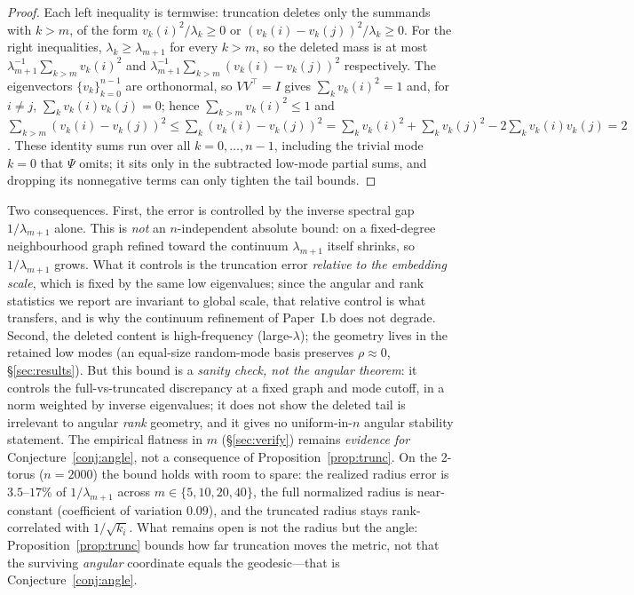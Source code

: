 \documentclass[review]{siamart220329}
\begin{document}
\begin{proof}
Each left inequality is termwise: truncation deletes only the summands with
$k>m$, of the form $v_k(i)^2/\lambda_k\ge0$ or
$(v_k(i)-v_k(j))^2/\lambda_k\ge0$. For the right inequalities,
$\lambda_k\ge\lambda_{m+1}$ for every $k>m$, so the deleted mass is at most
$\lambda_{m+1}^{-1}\sum_{k>m}v_k(i)^2$ and
$\lambda_{m+1}^{-1}\sum_{k>m}(v_k(i)-v_k(j))^2$ respectively. The eigenvectors
$\{v_k\}_{k=0}^{n-1}$ are orthonormal, so $VV^{\top}=I$ gives $\sum_k v_k(i)^2=1$
and, for $i\neq j$, $\sum_k v_k(i)v_k(j)=0$; hence $\sum_{k>m}v_k(i)^2\le1$ and
$\sum_{k>m}(v_k(i)-v_k(j))^2\le\sum_k(v_k(i)-v_k(j))^2
=\sum_k v_k(i)^2+\sum_k v_k(j)^2-2\sum_k v_k(i)v_k(j)=2$. These identity sums run
over all $k=0,\dots,n-1$, including the trivial mode $k=0$ that $\Psi$ omits; it
sits only in the subtracted low-mode partial sums, and dropping its nonnegative
terms can only tighten the tail bounds.
\end{proof}

Two consequences. First, the error is controlled by the inverse spectral gap
$1/\lambda_{m+1}$ alone. This is \emph{not} an $n$-independent absolute bound: on a
fixed-degree neighbourhood graph refined toward the continuum $\lambda_{m+1}$
itself shrinks, so $1/\lambda_{m+1}$ grows. What it controls is the truncation
error \emph{relative to the embedding scale}, which is fixed by the same low
eigenvalues; since the angular and rank statistics we report are invariant to
global scale, that relative control is what transfers, and is why the continuum
refinement of Paper~I.b does not degrade. Second, the deleted content is
high-frequency (large-$\lambda$); the geometry lives in the retained low modes
(an equal-size random-mode basis preserves $\rho\approx0$, \S\ref{sec:results}).
But this bound is a \emph{sanity check, not the angular theorem}: it controls
the full-vs-truncated discrepancy at a fixed graph and mode cutoff, in a norm
weighted by inverse eigenvalues; it does not show the deleted tail is
irrelevant to angular \emph{rank} geometry, and it gives no uniform-in-$n$
angular stability statement. The empirical flatness in $m$
(\S\ref{sec:verify}) remains \emph{evidence for}
Conjecture~\ref{conj:angle}, not a consequence of
Proposition~\ref{prop:trunc}. On the 2-torus
($n=2000$) the bound holds with room to spare: the realized radius error is
$3.5$--$17\%$ of $1/\lambda_{m+1}$ across $m\in\{5,10,20,40\}$, the full
normalized radius is near-constant (coefficient of variation $0.09$), and the
truncated radius stays rank-correlated with $1/\sqrt{k_i}$. What remains open is
not the radius but the angle: Proposition~\ref{prop:trunc} bounds how far
truncation moves the metric, not that the surviving \emph{angular} coordinate
equals the geodesic---that is Conjecture~\ref{conj:angle}.
\end{document}
